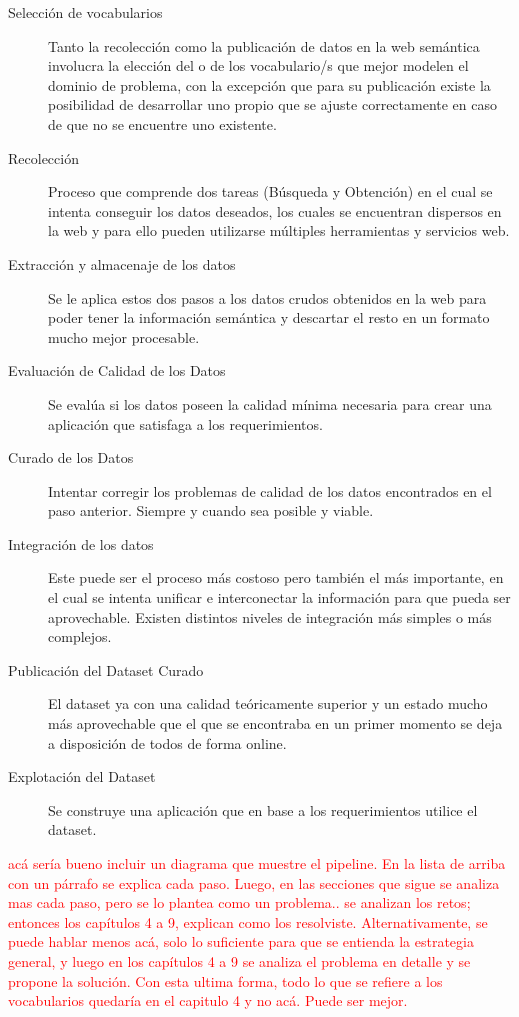 \begin{description}
\item[Selección de vocabularios ] Tanto la recolección como la publicación de datos en la web semántica involucra la elección del o de los vocabulario/s que mejor modelen el dominio de problema, con la excepción que para su publicación existe la posibilidad de desarrollar uno propio que se ajuste correctamente en caso de que no se encuentre uno existente. 
\item[Recolección  ] Proceso que comprende dos tareas (Búsqueda y Obtención) en el cual se intenta conseguir los datos deseados, los cuales se encuentran dispersos en la web y para ello pueden utilizarse múltiples herramientas y servicios web.
\item[Extracción y almacenaje de los datos] Se le aplica estos dos pasos a los datos crudos obtenidos en la web para poder tener la información semántica y descartar el resto en un formato mucho mejor procesable.
\item[Evaluación de Calidad de los Datos] Se evalúa si los datos poseen la calidad mínima necesaria para crear una aplicación que satisfaga a los requerimientos.
\item[Curado de los Datos] Intentar corregir los problemas de calidad de los datos encontrados en el paso anterior. Siempre y cuando sea posible y viable.
\item[Integración de los datos] Este puede ser el proceso más costoso pero también el más importante, en el cual se intenta unificar e interconectar la información para que pueda ser aprovechable. Existen distintos niveles de integración más simples o más complejos.
\item[Publicación del Dataset Curado] El dataset ya con una calidad teóricamente superior y un estado mucho más aprovechable que el que se encontraba en un primer momento se deja a disposición de todos de forma online.  
\item[Explotación del Dataset] Se construye una aplicación que en base a los requerimientos utilice el dataset. 
\end{description}

\begin{framed}
\textcolor{red}{acá sería bueno incluir un diagrama que muestre el pipeline. En la lista de arriba con un párrafo se explica cada paso. Luego, en las secciones que sigue se analiza mas cada paso, pero se lo plantea como un problema.. se analizan los retos; entonces los capítulos 4 a 9, explican como los resolviste. Alternativamente, se puede hablar menos acá, solo lo suficiente para que se entienda la estrategia general, y luego en los capítulos 4 a 9 se analiza el problema en detalle y se propone la solución. Con esta ultima forma, todo lo que se refiere a los vocabularios quedaría en el capitulo 4 y no acá. Puede ser mejor.}
\end{framed}

